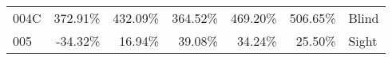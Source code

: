 \begin{table}[!htb]
\begin{tabular}{lrrrrrl}
004C        &  372.91\% &  432.09\% &                                              364.52\% &                                               469.20\% &  506.65\% &                                                      Blind \\
005         &  -34.32\% &   16.94\% &                                               39.08\% &                                                34.24\% &   25.50\% &                                                      Sight \\
\bottomrule
\end{tabular}
\end{table}

